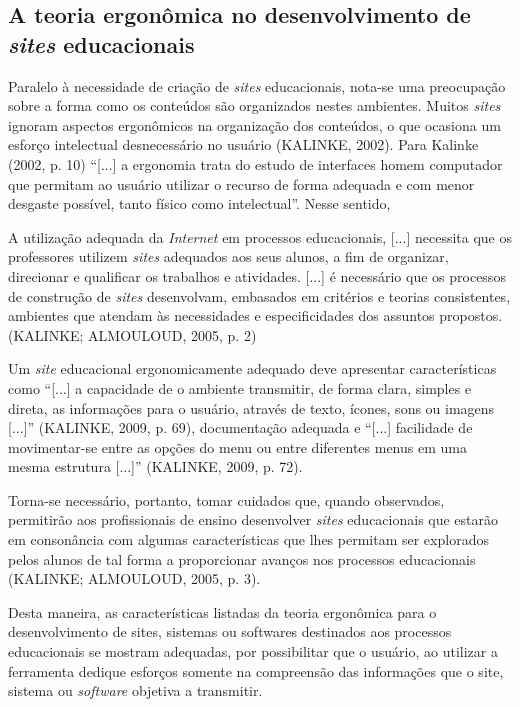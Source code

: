 \documentclass{IFNMG}
\begin{document}
\subsection{A teoria ergonômica no desenvolvimento de \textit{sites} educacionais}
Paralelo à necessidade de criação de \textit{sites} educacionais, nota-se uma preocupação sobre a forma como os conteúdos são organizados nestes ambientes. Muitos \textit{sites} ignoram aspectos ergonômicos na organização dos conteúdos, o que ocasiona um esforço intelectual desnecessário no usuário (KALINKE, 2002).
Para Kalinke (2002, p. 10) “[...] a ergonomia trata do estudo de interfaces homem computador que permitam ao usuário utilizar o recurso de forma adequada e com menor desgaste possível, tanto físico como intelectual”. Nesse sentido,
\begin{CitacaoLonga} 
A utilização adequada da \textit{Internet} em processos educacionais, [...] necessita que os professores utilizem \textit{sites} adequados aos seus alunos, a fim de organizar, direcionar e qualificar os trabalhos e atividades. [...] é necessário que os processos de construção de \textit{sites} desenvolvam, embasados em critérios e teorias consistentes, ambientes que atendam às necessidades e especificidades dos assuntos propostos. (KALINKE;  ALMOULOUD, 2005, p. 2)
\end{CitacaoLonga} 
Um \textit{site} educacional ergonomicamente adequado deve apresentar características como “[...] a capacidade de o ambiente transmitir, de forma clara, simples e direta, as informações para o usuário, através de texto, ícones, sons ou imagens [...]” (KALINKE, 2009, p. 69), documentação adequada e “[...] facilidade de movimentar-se entre as opções do menu ou entre diferentes menus em uma mesma estrutura [...]” (KALINKE, 2009, p. 72).
\begin{CitacaoLonga} 
Torna-se necessário, portanto, tomar cuidados que, quando observados, permitirão aos profissionais de ensino desenvolver \textit{sites} educacionais que estarão em consonância com algumas características que lhes permitam ser explorados pelos alunos de tal forma a proporcionar avanços nos processos educacionais (KALINKE; ALMOULOUD, 2005, p. 3).
\end{CitacaoLonga} 
Desta maneira, as características listadas da teoria ergonômica para o desenvolvimento de sites, sistemas ou softwares destinados aos processos educacionais se mostram adequadas, por possibilitar que o usuário, ao utilizar a ferramenta dedique esforços somente na compreensão das informações que o site, sistema ou \textit{software} objetiva a transmitir.
\end{document}
